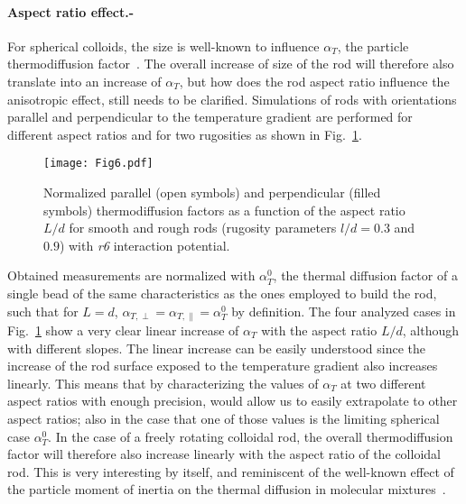 \documentclass[aps,pre,twocolumn,showpacs,superscriptaddress]{revtex4-1}
\begin{document}
\paragraph{Aspect ratio effect.-}
For spherical colloids, the size is well-known to influence
$\alpha_T$, the particle thermodiffusion
factor~\cite{piazza08,braun06c,luese12jpcm}.  The overall increase of
size of the rod will therefore also translate into an increase of
$\alpha_T$, but how does the rod aspect ratio influence the
anisotropic effect, still needs to be clarified.  Simulations of rods
with orientations parallel and perpendicular to the temperature
gradient are performed for different aspect ratios and for two
rugosities as shown in Fig.~\ref{fig:aT_aspR}.  %
\begin{figure}[h!]
\texttt{[image: Fig6.pdf]}
\caption{\label{fig:aT_aspR} Normalized parallel (open symbols) and
  perpendicular (filled symbols) thermodiffusion factors as a function
  of the aspect ratio $L/d$ for smooth and rough rods (rugosity
  parameters $l/d= 0.3$ and $0.9$) with {\em r6} interaction
  potential.}
\end{figure}
Obtained measurements are normalized with $\alpha_{T}^0$, the thermal
diffusion factor of a single bead of the same characteristics as the
ones employed to build the rod, such that for $L=d$,
$\alpha_{T,\perp}=\alpha_{T,\|}=\alpha_{T}^0$ by definition.  The four
analyzed cases in Fig.~\ref{fig:aT_aspR} show a very clear linear
increase of $\alpha_T$ with the aspect ratio $L/d$, although with
different slopes. The linear increase can be easily understood since
the increase of the rod surface exposed to the temperature gradient
also increases linearly. This means that by characterizing the values
of $\alpha_T$ at two different aspect ratios with enough precision,
would allow us to easily extrapolate to other aspect ratios; also in
the case that one of those values is the limiting spherical case
$\alpha_T^0$. %
In the case of a freely rotating colloidal rod, the overall
thermodiffusion factor will therefore also increase linearly with the
aspect ratio of the colloidal rod. This is very interesting by
  itself, and reminiscent of the well-known effect of the particle
  moment of inertia on the thermal diffusion in molecular
  mixtures~\cite{plathe00,koeh01,gal03}.
\end{document}
